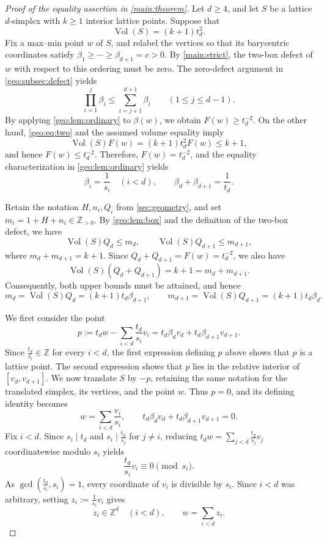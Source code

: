 \documentclass[reqno, 11pt]{article}
\numberwithin{equation}{section}
\theoremstyle{definition}
\begin{document}
\begin{proof}[Proof of the equality assertion in \cref{main:theorem}]

Let $d\ge4$, and let $S$ be a lattice $d$-simplex with $k\ge1$ interior lattice points. Suppose that
\[
\operatorname{Vol}(S)=(k+1)t_d^2.
\]
Fix a max--min point $w$ of $S$, and relabel the vertices so that its barycentric coordinates satisfy $\beta_1\ge\cdots\ge\beta_{d+1}=c>0$.
By \cref{main:strict}, the two-box defect of $w$ with respect to this ordering must be zero.
The zero-defect argument in \cref{geo:subsec:defect} yields
\[
\prod_{i=1}^j\beta_i\le\sum_{i=j+1}^{d+1}\beta_i
\qquad(1\le j\le d-1).
\]
By applying \cref{geo:lem:ordinary} to $\beta(w)$, we obtain $F(w)\ge t_d^{-2}$. On the other hand, \eqref{geo:eq:two} and the assumed volume equality imply
\[
\operatorname{Vol}(S)F(w)=(k+1)t_d^2F(w)\le k+1,
\]
and hence $F(w)\le t_d^{-2}$. Therefore, $F(w)=t_d^{-2}$, and the equality characterization in \cref{geo:lem:ordinary} yields
\[
\beta_i=\frac1{s_i}\quad(i<d),
\qquad
\beta_d+\beta_{d+1}=\frac1{t_d}.
\]

Retain the notation $H,n_i,Q_i$ from \cref{sec:geometry}, and set $m_i=1+H+n_i\in\mathbb Z_{>0}$. By \cref{geo:lem:box} and the definition of the two-box defect, we have
\[
\operatorname{Vol}(S)Q_d\le m_d,
\qquad
\operatorname{Vol}(S)Q_{d+1}\le m_{d+1},
\]
where $m_d+m_{d+1}=k+1$. Since $Q_d+Q_{d+1}=F(w)=t_d^{-2}$, we also have
\[
 \operatorname{Vol}(S)(Q_d+Q_{d+1})=k+1=m_d+m_{d+1}.
\]
Consequently, both upper bounds must be attained, and hence
\begin{equation}\label{eq:6-betadandd+1}
m_d=\operatorname{Vol}(S)Q_d
=(k+1)t_d\beta_{d+1},\qquad 
m_{d+1}=\operatorname{Vol}(S)Q_{d+1}
=(k+1)t_d\beta_d.
\end{equation}

We first consider the point
\[
p:=t_dw-\sum_{i<d}\frac{t_d}{s_i}v_i
=t_d\beta_dv_d+t_d\beta_{d+1}v_{d+1}.
\]
Since $\frac{t_d}{s_i}\in\mathbb Z$ for every $i<d$, the first
expression defining \(p\) above shows that $p$ is a lattice point. The second expression shows that $p$ lies in the relative interior of $[v_d,v_{d+1}]$. We now translate $S$ by $-p$, retaining the same notation for the translated simplex, its vertices, and the point $w$. Thus $p=0$, and its defining identity becomes
\[
w=\sum_{i<d}\frac{v_i}{s_i},
\qquad
t_d\beta_dv_d+t_d\beta_{d+1}v_{d+1}=0.
\]
Fix $i<d$. Since $s_i\mid t_d$ and $s_i\mid \frac{t_d}{s_j}$ for $j\ne i$, reducing $t_dw=\sum_{j<d}\frac{t_d}{s_j}v_j$
coordinatewise modulo $s_i$ yields
\[
\frac{t_d}{s_i}v_i\equiv0\pmod{s_i}.
\]
As $\gcd(\frac{t_d}{s_i},s_i)=1$, every coordinate of $v_i$ is divisible by $s_i$. Since $i<d$ was arbitrary, setting $z_i:=\frac{1}{s_i}v_i$ gives
\[
z_i\in\mathbb Z^d\quad(i<d),
\qquad
w=\sum_{i<d}z_i.
\]




\end{proof}
\end{document}
